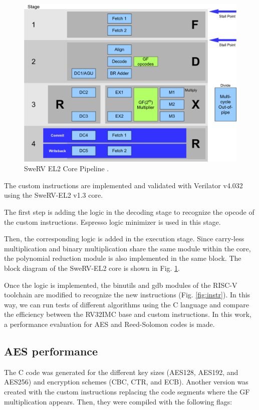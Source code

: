 \begin{figure}[b]
    \centering
    \includegraphics[width=0.95\linewidth]{img/swerv.png}
    \caption{SweRV EL2 Core Pipeline \cite{swervel2}.}
    \label{fig:swerv}
\end{figure}

The custom instructions are implemented and validated with Verilator v4.032 using the SweRV-EL2 v1.3 core.

The first step is adding the logic in the decoding stage to recognize the opcode of the custom instructions. 
Espresso logic minimizer \cite{250190} is used in this stage.

Then, the corresponding logic is added in the execution stage. Since carry-less multiplication and binary 
multiplication share the same module within the core, the polynomial reduction module is also implemented 
in the same block. The block diagram of the SweRV-EL2 core is shown in Fig. \ref{fig:swerv}.

Once the logic is implemented, the binutils and gdb modules of the RISC-V toolchain are modified to recognize the new instructions (Fig. \ref{fig:instr}). 
In this way, we can run tests of different algorithms using the C language and compare the efficiency between the RV32IMC base and custom instructions. 
In this work, a performance evaluation for AES and Reed-Solomon codes is made.

\subsection{AES performance} 

The C code was generated for the different key sizes (AES128, AES192, and AES256) and encryption schemes (CBC, CTR, and ECB). Another version was created with the custom instructions replacing
the code segments where the GF multiplication appears. 
Then, they were compiled with the following flags: 


